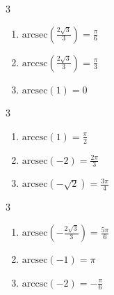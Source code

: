 \documentclass{ximera}
\begin{document}
\begin{multicols}{3} 

\begin{enumerate}

\setcounter{enumi}{\value{HW}}

\item $\mbox{arcsec} \left( \frac{2\sqrt{3}}{3} \right) = \frac{\pi}{6}$
\item $\mbox{arccsc} \left( \frac{2\sqrt{3}}{3} \right) = \frac{\pi}{3}$
\item $\mbox{arcsec} \left( 1 \right) = 0$ 

\setcounter{HW}{\value{enumi}}

\end{enumerate}

\end{multicols}

\begin{multicols}{3} 

\begin{enumerate}

\setcounter{enumi}{\value{HW}}

\item $\mbox{arccsc} \left( 1 \right) = \frac{\pi}{2}$ 
\item $\mbox{arcsec} \left( -2 \right) = \frac{2\pi}{3}$ 
\item $\mbox{arcsec} \left( -\sqrt{2} \right) = \frac{3\pi}{4}$ 


\setcounter{HW}{\value{enumi}}

\end{enumerate}

\end{multicols}

\begin{multicols}{3} 

\begin{enumerate}

\setcounter{enumi}{\value{HW}}


\item $\mbox{arcsec} \left( -\frac{2\sqrt{3}}{3} \right) = \frac{5\pi}{6}$
\item $\mbox{arcsec} \left( -1 \right) = \pi$ 
\item $\mbox{arccsc} \left( -2 \right) = -\frac{\pi}{6}$ 

\setcounter{HW}{\value{enumi}}

\end{enumerate}

\end{multicols}
\end{document}
